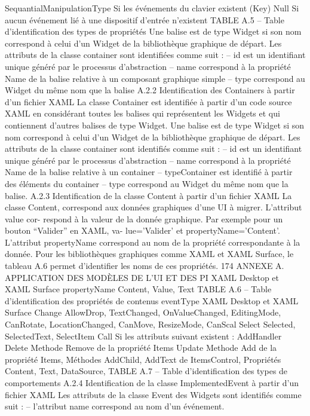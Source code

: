 \documentclass{article}
\begin{document}
SequantialManipulationType
Si les événements du clavier existent (Key)
Null
Si aucun événement lié à une dispositif d’entrée n’existent
TABLE A.5 – Table d’identiﬁcation des types de propriétés
Une balise est de type Widget si son nom correspond à celui d’un Widget de la bibliothèque
graphique de départ.
Les attributs de la classe container sont identiﬁées comme suit :
– id est un identiﬁant unique généré par le processus d’abstraction
– name correspond à la propriété Name de la balise relative à un composant graphique simple
– type correspond au Widget du même nom que la balise
A.2.2
Identiﬁcation des Containers à partir d’un ﬁchier XAML
La classe Container est identiﬁée à partir d’un code source XAML en considérant toutes les balises
qui représentent les Widgets et qui contiennent d’autres balises de type Widget.
Une balise est de type Widget si son nom correspond à celui d’un Widget de la bibliothèque
graphique de départ.
Les attributs de la classe container sont identiﬁés comme suit :
– id est un identiﬁant unique généré par le processus d’abstraction
– name correspond à la propriété Name de la balise relative à un container
– typeContainer est identiﬁé à partir des éléments du container
– type correspond au Widget du même nom que la balise.
A.2.3
Identiﬁcation de la classe Content à partir d’un ﬁchier XAML
La classe Content, correspond aux données graphiques d’une UI à migrer. L’attribut value cor-
respond à la valeur de la donnée graphique. Par exemple pour un bouton “Valider” en XAML, va-
lue=’Valider’ et propertyName=’Content’. L’attribut propertyName correspond au nom de la propriété
correspondante à la donnée. Pour les bibliothèques graphiques comme XAML et XAML Surface, le
tableau A.6 permet d’identiﬁer les noms de ces propriétés.
174
ANNEXE A. APPLICATION DES MODÈLES DE L’UI ET DES PI
XAML Desktop et XAML Surface
propertyName
Content, Value, Text
TABLE A.6 – Table d’identiﬁcation des propriétés de contenus
eventType
XAML Desktop et XAML Surface
Change
AllowDrop, TextChanged, OnValueChanged, EditingMode, CanRotate,
LocationChanged, CanMove, ResizeMode, CanScal
Select
Selected, SelectedText, SelectItem
Call
Si les attributs suivant existent : AddHandler
Delete
Methode Remove de la propriété Items
Update
Methode Add de la propriété Items, Méthodes AddChild, AddText de ItemsControl,
Propriétés Content, Text, DataSource,
TABLE A.7 – Table d’identiﬁcation des types de comportements
A.2.4
Identiﬁcation de la classe ImplementedEvent à partir d’un ﬁchier XAML
Les attributs de la classe Event des Widgets sont identiﬁés comme suit :
– l’attribut name correspond au nom d’un événement.
\end{document}
